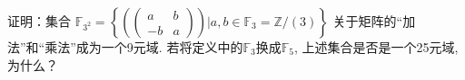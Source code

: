 \begin{solution}
    
\end{solution}

\begin{problem}
    证明：集合
\(
    \mathbb{F}_{3^2} =
    \left\{
        \left(
        \begin{pmatrix}
            a & b\\
            -b & a
        \end{pmatrix}
        \right) 
    \bigg| a, b \in \mathbb{F}_3 = \mathbb{Z}/(3)
    \right\}
\)
关于矩阵的“加法”和“乘法”成为一个9元域.
若将定义中的$\mathbb{F}_3$换成$\mathbb{F}_5$,
上述集合是否是一个25元域, 为什么？
\end{problem}

\begin{solution}
    
\end{solution}